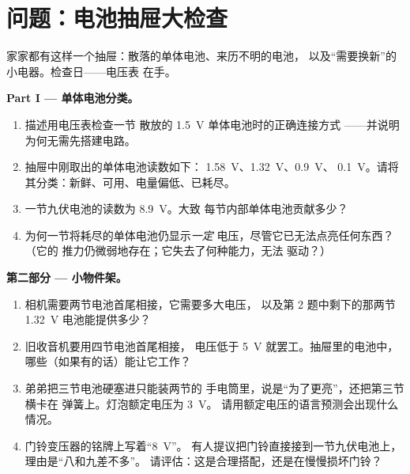 \section{问题：电池抽屉大检查}

\begin{problem}\label{pb:g8:voltage-voltmeter:1}
家家都有这样一个抽屉：散落的单体电池、来历不明的电池，
以及“需要换新”的小电器。检查日——电压表
在手。

\medskip\noindent\textbf{Part I --- 单体电池分类。}
\begin{enumerate}
  \item 描述用电压表检查一节
        散放的 \qty{1.5}{V} 单体电池时的正确连接方式
        ——并说明为何无需先搭建电路。
  \item 抽屉中刚取出的单体电池读数如下：
        \qty{1.58}{V}、\qty{1.32}{V}、\qty{0.9}{V}、
        \qty{0.1}{V}。请将其分类：新鲜、可用、电量偏低、已耗尽。
  \item 一节九伏电池的读数为 \qty{8.9}{V}。大致
        每节内部单体电池贡献多少？
  \item 为何一节将耗尽的单体电池仍显示\emph{一定}
        电压，尽管它已无法点亮任何东西？（它的
        推力仍微弱地存在；它失去了何种能力，无法
        驱动？）
\end{enumerate}

\medskip\noindent\textbf{第二部分 --- 小物件架。}
\begin{enumerate}[resume]
  \item 相机需要两节电池首尾相接，它需要多大电压，
        以及第 2 题中剩下的那两节
        \qty{1.32}{V} 电池能提供多少？
  \item 旧收音机要用四节电池首尾相接，
        电压低于 \qty{5}{V} 就罢工。抽屉里的电池中，
        哪些（如果有的话）能让它工作？
  \item 弟弟把三节电池硬塞进只能装两节的
        手电筒里，说是“为了更亮”，还把第三节横卡在
        弹簧上。灯泡额定电压为 \qty{3}{V}。
        请用额定电压的语言预测会出现什么情况。
  \item 门铃变压器的铭牌上写着“\qty{8}{V}”。
        有人提议把门铃直接接到一节九伏电池上，
        理由是“八和九差不多”。
        请评估：这是合理搭配，还是在慢慢损坏门铃？
\end{enumerate}


\end{problem}
